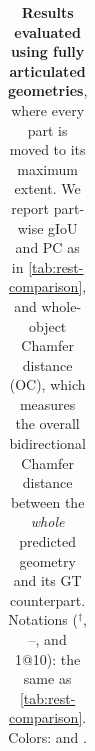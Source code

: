 \begin{table}[t]
{\begin{tabular}{@{}lcccccc@{}}
\bottomrule
\end{tabular}%
}
\caption{
\textbf{Results evaluated using fully articulated geometries}, where every part is moved to its maximum extent.
We report part-wise gIoU and PC as in \cref{tab:rest-comparison}, and whole-object Chamfer distance (OC),
which measures the overall bidirectional Chamfer distance between the \emph{whole} predicted geometry and its GT counterpart.
Notations ($^\dagger$, --, and 1@10): the same as \cref{tab:rest-comparison}.
%
%
%
Colors:  and .
}
\vspace{-1em}
\label{tab:full-comparison}
\end{table}
